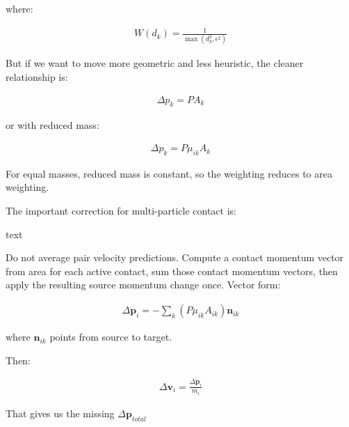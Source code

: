 where:

\begin{equation}
\begin{aligned}
\label{none}
W(d_k) = \frac{1}{\max(d_k^2, \epsilon^2)}
\end{aligned}
\end{equation}

But if we want to move more geometric and less heuristic, the cleaner relationship is:

\begin{equation}
\begin{aligned}
\label{none}
\Delta p_k = P A_k
\end{aligned}
\end{equation}

or with reduced mass:

\begin{equation}
\begin{aligned}
\label{none}
\Delta p_k = P \mu_{ik} A_k
\end{aligned}
\end{equation}

For equal masses, reduced mass is constant, so the weighting reduces to area weighting.

The important correction for multi-particle contact is:

text


Do not average pair velocity predictions.
Compute a contact momentum vector from area for each active contact,
sum those contact momentum vectors,
then apply the resulting source momentum change once.
Vector form:


\begin{equation}
\begin{aligned}
\label{none}
\Delta \mathbf{p}_{i}=-\sum_k\left(P \mu_{ik} A_{ik}\right)\mathbf{n}_{ik}
\end{aligned}
\end{equation}

where $\mathbf{n}_{ik}$ points from source to target.

Then:

\begin{equation}
\begin{aligned}
\label{none}
\Delta \mathbf{v}_{i}=\frac{\Delta \mathbf{p}_{i}}{m_i}
\end{aligned}
\end{equation}

That gives us the missing $\Delta \mathbf{p}_{total}$

